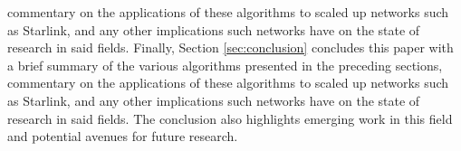 commentary on the applications of these algorithms to scaled up networks such as Starlink, and any other implications such networks have on the state of research in said fields. Finally, Section \ref{sec:conclusion} concludes this paper with a brief summary of the various algorithms presented in the preceding sections, commentary on the applications of these algorithms to scaled up networks such as Starlink, and any other implications such networks have on the state of research in said fields. The conclusion also highlights emerging work in this field and potential avenues for future research.